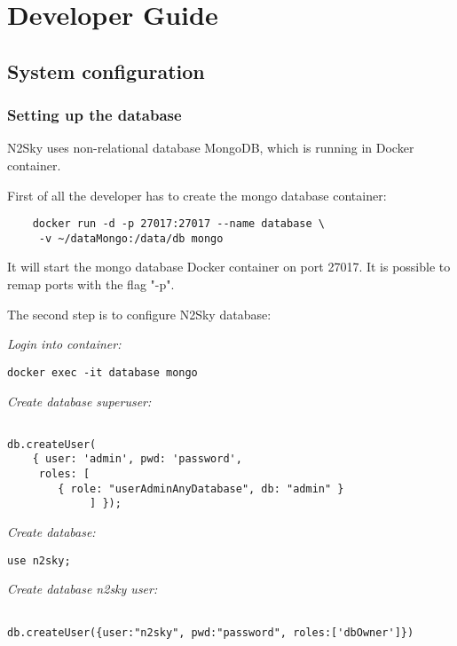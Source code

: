 \section{Developer Guide}\label{Developer Guide}

\subsection{System configuration}\label{System configuration}

\subsubsection{Setting up the database}\label{database setup}

N2Sky uses non-relational database MongoDB, which is running in Docker container. 

First of all the developer has to create  the mongo database container:

 \begin{lstlisting}
	docker run -d -p 27017:27017 --name database \
	 -v ~/dataMongo:/data/db mongo
\end{lstlisting}

It will start the mongo database Docker container on port 27017. 
It is possible to remap ports with the flag "-p".

The second step is to configure N2Sky database:

\emph{Login into container:}  
 \begin{lstlisting}
docker exec -it database mongo
\end{lstlisting}

\emph{Create database superuser:}
 \begin{lstlisting}
 
db.createUser(
	{ user: 'admin', pwd: 'password',
	 roles: [
	 	{ role: "userAdminAnyDatabase", db: "admin" }
			 ] });

\end{lstlisting}



\emph{Create database:}
 \begin{lstlisting}
use n2sky;
\end{lstlisting}


\emph{Create database n2sky user:}
 \begin{lstlisting}
 
db.createUser({user:"n2sky", pwd:"password", roles:['dbOwner']})

\end{lstlisting}

